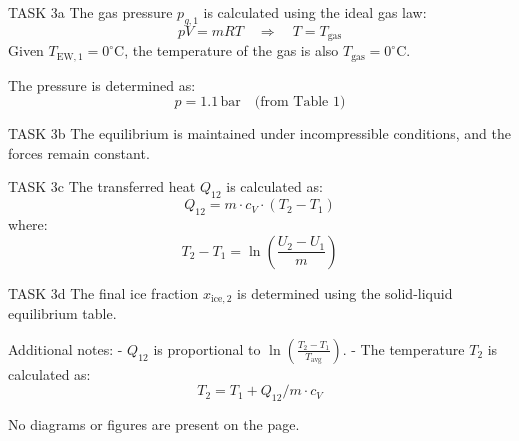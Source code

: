 TASK 3a  
The gas pressure \( p_{g,1} \) is calculated using the ideal gas law:  
\[
pV = mRT \quad \Rightarrow \quad T = T_{\text{gas}}
\]  
Given \( T_{\text{EW},1} = 0^\circ\text{C} \), the temperature of the gas is also \( T_{\text{gas}} = 0^\circ\text{C} \).  

The pressure is determined as:  
\[
p = 1.1 \, \text{bar} \quad \text{(from Table 1)}  
\]  

TASK 3b  
The equilibrium is maintained under incompressible conditions, and the forces remain constant.  

TASK 3c  
The transferred heat \( Q_{12} \) is calculated as:  
\[
Q_{12} = m \cdot c_V \cdot (T_2 - T_1)  
\]  
where:  
\[
T_2 - T_1 = \ln \left( \frac{U_2 - U_1}{m} \right)  
\]  

TASK 3d  
The final ice fraction \( x_{\text{ice},2} \) is determined using the solid-liquid equilibrium table.  

Additional notes:  
- \( Q_{12} \) is proportional to \( \ln \left( \frac{T_2 - T_1}{T_{\text{avg}}} \right) \).  
- The temperature \( T_2 \) is calculated as:  
\[
T_2 = T_1 + Q_{12} / m \cdot c_V  
\]  

No diagrams or figures are present on the page.